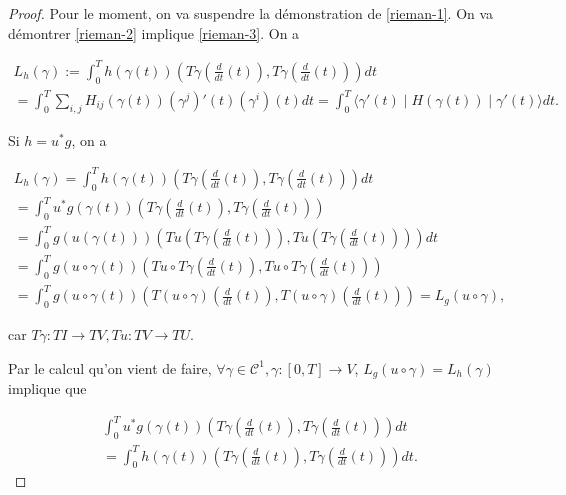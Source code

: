 \documentclass[french]{article}
\theoremstyle{definition}
\theoremstyle{remark}
\begin{document}
\begin{proof}
  Pour le moment, on va suspendre la démonstration de \ref{rieman-1}. On va démontrer \ref{rieman-2} implique \ref{rieman-3}. On a

  \begin{gather*}
    L_h(\gamma) := \int_{0}^{T} h(\gamma(t))(T \gamma \left(\frac{d}{dt}(t)\right), T \gamma \left(\frac{d}{dt}(t)\right))dt \\
    = \int_{0}^{T} \sum_{i,j}^{} H _{ij}(\gamma(t))(\gamma ^{j})'(t) (\gamma ^{i})(t)dt = \int_{0}^{T} \langle \gamma'(t) \mid H (\gamma(t)) \mid \gamma'(t) \rangle dt.
  \end{gather*}


  Si \(h = u ^{*}g\), on a

  \begin{gather*}
    L_h(\gamma) = \int_{0}^{T} h(\gamma(t)) \left(T \gamma \left(\frac{d}{dt}(t)\right), T \gamma \left(\frac{d}{dt}(t)\right)\right) dt \\
    = \int_{0}^{T} u ^{*}g(\gamma(t))\left(T \gamma \left(\frac{d}{dt}(t)\right), T \gamma \left(\frac{d}{dt}(t)\right)\right) \\
    = \int_{0}^{T} g(u(\gamma(t))) (T u (T \gamma \left(\frac{d}{dt}(t)\right)), T u \left(T \gamma \left(\frac{d}{dt}(t)\right)\right))  dt\\
    = \int_{0}^{T} g (u \circ \gamma(t)) \left(T u \circ T \gamma \left(\frac{d}{dt}(t)\right), T u \circ T \gamma \left(\frac{d}{dt}(t)\right)\right)  \\
    = \int_{0}^{T} g(u \circ \gamma(t)) \left(T (u \circ \gamma) \left(\frac{d}{dt}(t)\right), T(u \circ \gamma)\left(\frac{d}{dt}(t)\right)\right)  = L_g(u \circ \gamma),
  \end{gather*}

  car \(T \gamma : T I \longrightarrow T V, T u : T V \longrightarrow T U\).

  Par le calcul qu'on vient de faire, \(\forall \gamma \in \mathcal{C}^1, \gamma : [0,T] \longrightarrow V\), \(L_g (u \circ \gamma) = L_h(\gamma)\) implique que

  \begin{gather*}
    \int_{0}^{T} u ^{*}g(\gamma(t))\left(T \gamma \left(\frac{d}{dt}(t)\right), T \gamma \left(\frac{d}{dt}(t)\right)\right) dt \\
    = \int_{0}^{T} h (\gamma(t)) \left(T \gamma \left(\frac{d}{dt}(t)\right), T \gamma \left(\frac{d}{dt}(t)\right)\right) dt.
  \end{gather*}


\end{proof}
\end{document}
